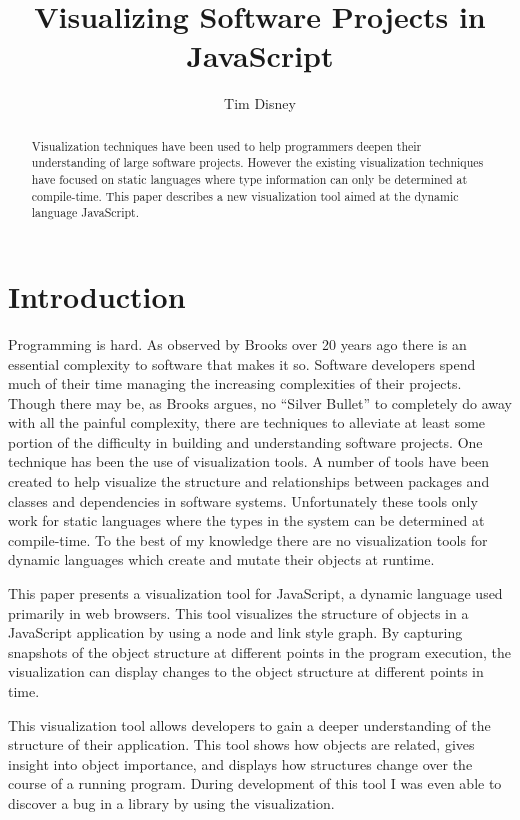 \documentclass[]{article}
\begin{document}
\title{Visualizing Software Projects in JavaScript}
\author{Tim Disney}
\date{}

\maketitle

\lstset{showstringspaces=false}

\begin{abstract}
  Visualization techniques have been used to help programmers deepen their understanding of large software projects. However the existing visualization techniques have focused on static languages where type information can only be determined at compile-time. This paper describes a new visualization tool aimed at the dynamic language JavaScript.
\end{abstract}

\section{Introduction}
\label{sec:introduction}
Programming is hard. As observed by Brooks \cite{brooks1987no} over 20 years ago there is an essential complexity to software that makes it so. Software developers spend much of their time managing the increasing complexities of their projects. Though there may be, as Brooks argues, no ``Silver Bullet'' to completely do away with all the painful complexity, there are techniques to alleviate at least some portion of the difficulty in building and understanding software projects. One technique has been the use of visualization tools. A number of tools have been created to help visualize the structure and relationships between packages and classes \cite{solidsx, haskellvis} and dependencies \cite{idea, stan4j} in software systems. Unfortunately these tools only work for static languages where the types in the system can be determined at compile-time. To the best of my knowledge there are no visualization tools for dynamic languages which create and mutate their objects at runtime.

This paper presents a visualization tool for JavaScript, a dynamic language used primarily in web browsers. This tool visualizes the structure of objects in a JavaScript application by using a node and link style graph. By capturing snapshots of the object structure at different points in the program execution, the visualization can display changes to the object structure at different points in time. 

This visualization tool allows developers to gain a deeper understanding of the structure of their application. This tool shows how objects are related, gives insight into object importance, and displays how structures change over the course of a running program. During development of this tool I was even able to discover a bug in a library by using the visualization.
\end{document}
